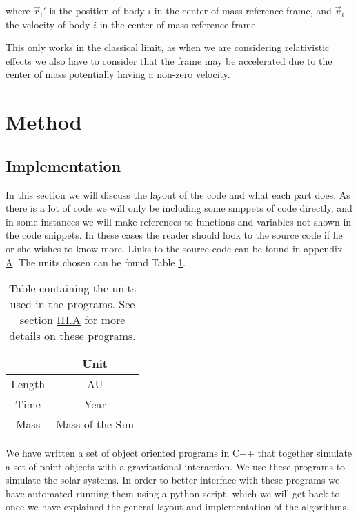\documentclass[reprint,english,notitlepage]{revtex4-1}  %
\begin{document}
where $\vec{r}_i'$ is the position of body $i$ in the center of mass reference frame, and $\vec{v}_i$ the velocity of body $i$ in the center of mass reference frame.

This only works in the classical limit, as when we are considering relativistic effects we also have to consider that the frame may be accelerated due to the center of mass potentially having a non-zero velocity.
\newpage \newpage



\section{Method} \label{sec:III}

\subsection{Implementation} \label{sec:III:a}

In this section we will discuss the layout of the code and what each part does. As there is a lot of code we will only be including some snippets of code directly, and in some instances we will make references to functions and variables not shown in the code snippets. In these cases the reader should look to the source code if he or she wishes to know more. Links to the source code can be found in appendix \hyperref[A]{A}. The units chosen can be found Table \hyperref[table:III:a:i]{1}.

\begin{table}[h!] \label{table:III:a:i}
\caption{Table containing the units used in the programs. See section \hyperref[sec:III:a]{III.A} for more details on these programs.}
\begin{tabular}{|c|c|}
\hline
 & Unit \\
\hline
Length & AU \\
Time & Year \\
Mass & Mass of the Sun \\
\hline
\end{tabular}
\end{table}

We have written a set of object oriented programs in C++ that together simulate a set of point objects with a gravitational interaction. We use these programs to simulate the solar systems. In order to better interface with these programs we have automated running them using a python script, which we will get back to once we have explained the general layout and implementation of the algorithms.
\end{document}
